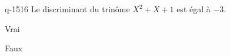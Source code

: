 \begin{truefalse}{q-1516}
Le discriminant du trinôme $X^2+X+1$ est égal à $-3$.
\item* Vrai
\item Faux
\end{truefalse}

